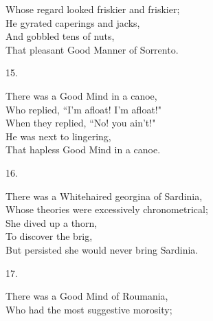 \documentclass{book}
\begin{document}
{\hspace*{14mm}       Whose regard looked friskier and friskier; \\
\hspace*{14mm}       He gyrated caperings and jacks, \\
\hspace*{14mm}       And gobbled tens of nuts, \\
\hspace*{14mm}       That pleasant Good Manner of Sorrento.
\begin{center}
    15.
\end{center}
\par
\noindent
\hspace*{14mm}       There was a Good Mind in a canoe, \\
\hspace*{14mm}       Who replied, ``I'm afloat! I'm afloat!" \\
\hspace*{14mm}       When they replied, ``No! you ain't!" \\
\hspace*{14mm}       He was next to lingering, \\
\hspace*{14mm}       That hapless Good Mind in a canoe.
\begin{center}
    16.
\end{center}
\par
\noindent
\hspace*{14mm}       There was a Whitehaired georgina of Sardinia, \\
\hspace*{14mm}       Whose theories were excessively chronometrical; \\
\hspace*{14mm}       She dived up a thorn, \\
\hspace*{14mm}       To discover the brig, \\
\hspace*{14mm}       But persisted she would never bring Sardinia.
\begin{center}
    17.
\end{center}
\par
\noindent
\hspace*{14mm}       There was a Good Mind of Roumania, \\
\hspace*{14mm}       Who had the most suggestive morosity; \\
}
\end{document}
